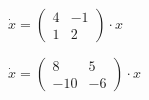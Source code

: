 \begin{multicols}{3}
\begin{enumtasks}
			\item \( \dot{x} = \begin{pmatrix} 4 & -1 \\ 1 & 2 \end{pmatrix} \cdot x \) %
			\item \( \dot{x} = \begin{pmatrix} 8 & 5 \\ -10 & -6 \end{pmatrix} \cdot x \) %



\end{enumtasks}
\end{multicols}
